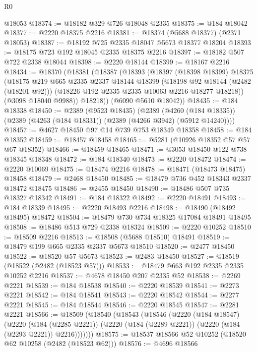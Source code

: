 \begin{lexlean}{R0}
\begin{coremodule}
    @18053
@18374 := @18182 @329 @726 @18048 @2335
@18375 := @184 @18042
@18377 := @2220 @18375 @2216
@18381 := @18374 (@5688 @18377) (@2371 @18053)
@18387 := @18192 @725 @2335 @18047 @5673 @18377 @18204
@18393 := @18175 @723 @192 @18045 @2335 @18375 @2216
@18397 := @18182 @507 @722 @2338 @18044
@18398 := @2220 @18144
@18399 := @18167 @2216
@18434 := @18370
    (@18381
      (@18387
        (@18393
          (@18397
            (@18398 @18399)
            @18375
            (@18175
              @219
              @665
              @2335
              @2337
              @18144
              @18399
              (@18198 @92 @18144 (@2482 (@18201 @92)))
              (@18226 @192 @2335 @2335 @10063 @2216 @18277 @18218))
            (@3098 @18040 @9988))
          @18218))
      (@6090 @5610 @18042))
@18435 := @184 @18338
@18450 := @2389
    (@9523 @18435)
    (@2389 (@4260 (@184 @18335)) (@2389 (@4263 (@184 @18331)) (@2389 (@4266 @3942) (@5912 @14240))))
@18457 := @4627 @18450 @97 @14 @739 @753 @18349 @18358
@18458 := @184 @18352
@18459 := @18457 @18458
@18465 := @5281 (@10926 @18352 @57 @57 @67 @18352)
@18466 := @18459 @18465
@18471 := @3053 @18450 @122 @738 @18345 @18348
@18472 := @184 @18340
@18473 := @2220 @18472
@18474 := @2220 @10069
@18475 := @18474 @2216
@18478 := @18471 (@18473 @18475) @18458
@18479 := @2468 @18450
@18485 := @18479 @736 @452 @18343 @2337 @18472 @18475
@18486 := @2455 @18450
@18490 := @18486 @507 @735 @18327 @18342
@18491 := @184 @18322
@18492 := @2220 @18491
@18493 := @184 @18339
@18495 := @2220 @18493 @2216
@18498 := @18490 (@18492 @18495) @18472
@18504 := @18479 @730 @734 @18325 @17084 @18491 @18495
@18508 := @18486 @513 @729 @2338 @18324
@18509 := @2220 @10252
@18510 := @18509 @2216
@18513 := @18508 (@5688 @18510) @18491
@18519 := @18479 @199 @665 @2335 @2337 @5673 @18510
@18520 := @2477 @18450
@18522 := @18520 @57 @5673
@18523 := @2483 @18450
@18527 := @18519 (@18522 (@2482 (@18523 @57)))
@18533 := @18479 @663 @192 @2335 @2335 @10252 @2216
@18537 := @4678 @18450 @207 @2335 @52
@18538 := @2269 @2221
@18539 := @184 @18538
@18540 := @2220 @18539
@18541 := @2273 @2221
@18542 := @184 @18541
@18543 := @2220 @18542
@18544 := @2277 @2221
@18545 := @184 @18544
@18546 := @2220 @18545
@18547 := @2281 @2221
@18566 := @18509
    (@18540
      (@18543
        (@18546
          (@2220
            (@184 @18547)
            (@2220
              (@184 (@2285 @2221))
              (@2220 (@184 (@2289 @2221)) (@2220 (@184 (@2293 @2221)) @2216)))))))
@18575 := @18537 @18566 @52 @10252 (@18520 @62 @10258 (@2482 (@18523 @62)))
@18576 := @4696 @18566

\end{coremodule}
\end{lexlean}
